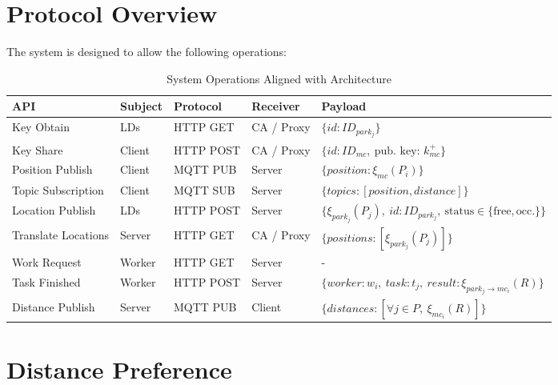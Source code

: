 
\section{Protocol Overview}
The system is designed to allow the following operations:

\begin{table}[h]
\renewcommand{\arraystretch}{1.3}
\small
\begin{tabularx}{\linewidth}{|l|X|X|X|p{4cm}|}
\hline
\textbf{API} & \textbf{Subject} & \textbf{Protocol} & \textbf{Receiver} & \textbf{Payload} \\ \hline

Key Obtain & LDs & HTTP GET & CA / Proxy & $\{id: ID_{park_j}\}$ \\ \hline

Key Share & Client & HTTP POST & CA / Proxy & $\{id: ID_{mc},\ \text{pub. key: } k_{mc}^+\}$ \\ \hline

Position Publish & Client & MQTT PUB & Server & $\{position: \xi_{mc}(P_i)\}$ \\ \hline

Topic Subscription & Client & MQTT SUB & Server & $\{topics: [position, distance]\}$ \\ \hline

Location Publish & LDs & HTTP POST & Server & $\{\xi_{park_j}(P_j),\ id: ID_{park_j},\ \text{status} \in \{\text{free}, \text{occ.}\}\}$ \\ \hline

Translate Locations & Server & HTTP GET & CA / Proxy & $\{positions: [\xi_{park_j}(P_{j})]\}$ \\ \hline

Work Request & Worker & HTTP GET & Server & - \\ \hline

Task Finished & Worker & HTTP POST & Server & $\{worker: w_i,\ task: t_j,\ result: \xi_{park_j \to mc_i}(R)\}$ \\ \hline

Distance Publish & Server & MQTT PUB & Client & $\{distances: [\forall j \in P,\ \xi_{mc_i}(R)]\}$ \\ \hline

\end{tabularx}
\caption{System Operations Aligned with Architecture}
\label{table:system-operations}
\end{table}

\section{Distance Preference}

